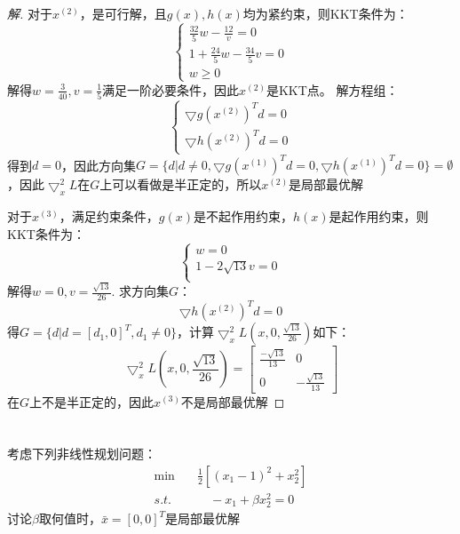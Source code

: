 \documentclass[a4paper]{article}
\begin{document}
\begin{proof}[解]
	对于$x^{(2)}$，是可行解，且$g(x),h(x)$均为紧约束，则KKT条件为：
	\begin{equation}
	\left\{
	\begin{array}{c}
	\frac{32}{5}w-\frac{12}{v}=0 \\
	1+\frac{24}{5}w-\frac{34}{5}v=0 \\
	w\ge 0
	\end{array}
	\right.
	\end{equation}
	解得$w=\frac{3}{40},v=\frac{1}{5}$满足一阶必要条件，因此$x^{(2)}$是KKT点。
	解方程组：
	\begin{equation}
	\left\{
	\begin{array}{c}
	\bigtriangledown g(x^{(2)})^Td=0 \\
	\bigtriangledown h(x^{(2)})^Td=0
	\end{array}
	\right.
	\end{equation}
	得到$d=0$，因此方向集$G=\{d|d\neq0,\bigtriangledown g(x^{(1)})^Td=0,\bigtriangledown h(x^{(1)})^Td=0\}=\emptyset$，因此$\bigtriangledown_x^2 L$在$G$上可以看做是半正定的，所以$x^{(2)}$是局部最优解
	
	对于$x^{(3)}$，满足约束条件，$g(x)$是不起作用约束，$h(x)$是起作用约束，则KKT条件为：
	\begin{equation}
	\left\{
	\begin{array}{c}
	w=0 \\
	1-2\sqrt{13}v=0 \\
	\end{array}
	\right.
	\end{equation}
	解得$w=0,v=\frac{\sqrt{13}}{26}$.
	求方向集$G$：
	\begin{equation}
	\bigtriangledown h(x^{(2)})^Td=0
	\end{equation}
	得$G=\{d|d=[d_1,0]^T,d_1\neq0\}$，计算$\bigtriangledown_x^2 L(x,0,\frac{\sqrt{13}}{26})$如下：
	\begin{equation}
	\bigtriangledown_x^2 L(x,0,\frac{\sqrt{13}}{26})=\left[
	\begin{array}{cc}
	\frac{-\sqrt{13}}{13} & 0\\
	0 & -\frac{\sqrt{13}}{13}
	\end{array}\right]
	\end{equation}
	在$G$上不是半正定的，因此$x^{(3)}$不是局部最优解
\end{proof}

\section{}
考虑下列非线性规划问题：
\begin{equation}
\begin{aligned}
\min\quad&\frac{1}{2}[(x_1-1)^2+x_2^2] \\
s.t.&\quad -x_1+\beta x_2^2=0
\end{aligned}
\end{equation}
讨论$\beta$取何值时，$\bar{x}=[0,0]^T$是局部最优解
\end{document}
